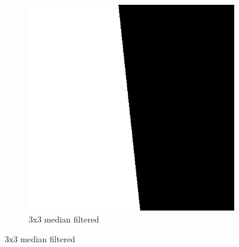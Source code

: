 \documentclass[a4paper]{article}
\begin{document}
\begin{figure}[H]
\begin{subfigure}[h]{0.48\textwidth}
		\includegraphics[width=\textwidth]{black_and_white_median_filtered_3x3}
		\caption*{3x3 median filtered}
	\end{subfigure}	
	

\end{figure}
\end{document}
